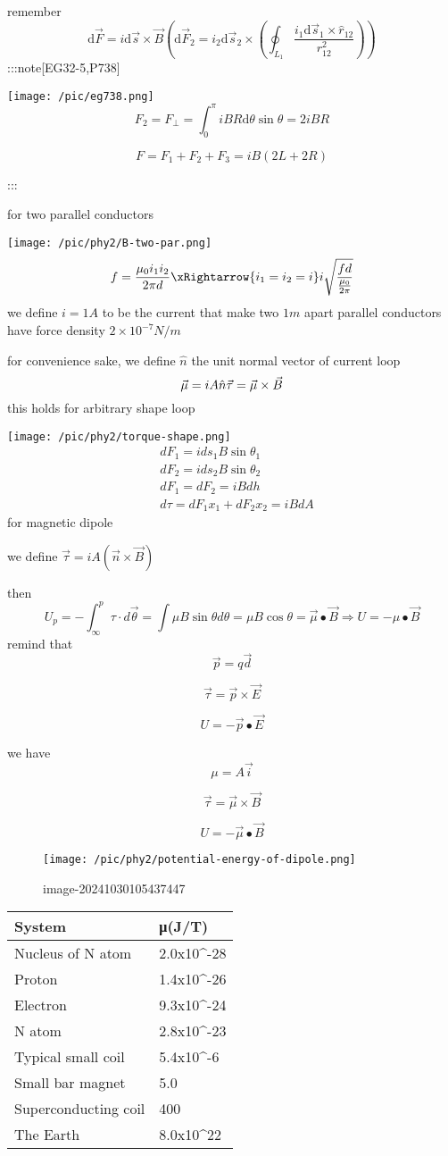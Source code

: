\documentclass[
]{article}
\begin{document}
remember \[
\mathrm d \vec F=i\mathrm d\vec s\times \vec B(\mathrm d \vec F_{2} =i_2\mathrm d\vec s_2\times \left(\oint _{L_1}\frac{i_1\mathrm d \vec s_1 \times \hat r_{12}}{r^2_{12}}\right))
\] :::note{[}EG32-5,P738{]}

\texttt{[image: /pic/eg738.png]} \[
F_{2}=F_{\perp}=\int_{0}^{\pi}iBR\mathrm d \theta \sin\theta=2iBR
\]

\[
F=F_1+F_2+F_3=iB(2L+2R)
\]

:::

for two parallel conductors

\texttt{[image: /pic/phy2/B-two-par.png]} \[
f=\frac{\mu_0i_1i_2}{2\pi d}\xRightarrow{i_1=i_2=i}i\sqrt{\frac{fd}{\frac{\mu_0}{2\pi}}}
\] we define \(i=1A\) to be the current that make two \(1m\) apart
parallel conductors have force density \(2\times 10^{-7}N/m\)

for convenience sake, we define \(\hat n\) the unit normal vector of
current loop \[
\vec \mu =iA\hat n\\\vec \tau=\vec \mu\times \vec B 
\] this holds for arbitrary shape loop

\texttt{[image: /pic/phy2/torque-shape.png]} \[
\begin{aligned}&dF_{1}=ids_{1}B\sin \theta _1\\&dF_2=ids_2 B\sin \theta _2\\&dF_1=dF_2=iBdh\\&d\tau =dF_1x_1+dF_2x_2=iBdA\end{aligned}
\] for magnetic dipole

we define \(\vec \tau=iA(\vec n \times \vec B)\)

then \[
U_p=-\int_{\infty}^{p} \tau \cdot d\vec \theta =\int \mu  B \sin \theta d\theta=\mu B \cos \theta =\vec \mu \bullet \vec B\Rightarrow U=-\mu \bullet \vec B
\] remind that \[
\vec p=q\vec d
\]

\[
\vec \tau =\vec p\times \vec E
\]

\[
U=-\vec p\bullet \vec E
\]

we have \[
\mu =A\vec i
\]

\[
\vec \tau =\vec \mu \times \vec B
\]

\[
U=-\vec \mu \bullet \vec B 
\]

\begin{figure}
\centering
\texttt{[image: /pic/phy2/potential-energy-of-dipole.png]}
\caption{image-20241030105437447}
\end{figure}

\begin{longtable}[]{@{}ll@{}}
\toprule()
System & μ(J/T) \\
\midrule()
\endhead
Nucleus of N atom & 2.0x10\^{}-28 \\
Proton & 1.4x10\^{}-26 \\
Electron & 9.3x10\^{}-24 \\
N atom & 2.8x10\^{}-23 \\
Typical small coil & 5.4x10\^{}-6 \\
Small bar magnet & 5.0 \\
Superconducting coil & 400 \\
The Earth & 8.0x10\^{}22 \\
\bottomrule()
\end{longtable}
\end{document}
